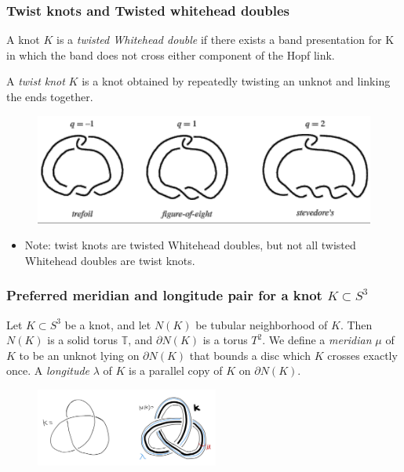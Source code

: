 \documentclass{beamer}
\theoremstyle{ex}
\theoremstyle{rem}
\begin{document}
	\begin{frame}
		\frametitle{Twist knots and Twisted whitehead doubles}
		\begin{definition}
			A knot $K$ is a \textit{twisted Whitehead double} if there exists a band presentation for K in which the band does not cross either component of the Hopf link. 
		\end{definition}
		\begin{definition}
			A \textit{twist knot} $K$ is a knot obtained by repeatedly twisting an unknot and linking the ends together.
		\end{definition}
			\begin{figure}
				{\includegraphics[scale=0.6] {twistknot}}
			\end{figure}
		
		\begin{itemize}
			\item Note: twist knots are twisted Whitehead doubles, but not all twisted Whitehead doubles are twist knots.
		\end{itemize}
	\end{frame}



	\begin{frame}
		\frametitle{Preferred meridian and longitude pair for a knot $K \subset S^3$}
		\begin{definition} 
		Let $K \subset S^3$ be a knot, and let $N(K)$ be tubular neighborhood of $K$. Then $N(K)$ is a solid torus $\mathbb{T}$, and $\partial N(K)$ is a torus $T^2$. We define a \textit{meridian} $\mu$ of $K$ to be an unknot lying on $\partial N(K)$ that bounds a disc which $K$ crosses exactly once. A \textit{longitude} $\lambda$ of $K$ is a parallel copy of $K$ on $\partial N(K)$.
		\end{definition}
		\begin{figure}
			\centering
			\includegraphics[width=60mm]{N(K).jpg}
		\end{figure}
		
	\end{frame}	
\end{document}
